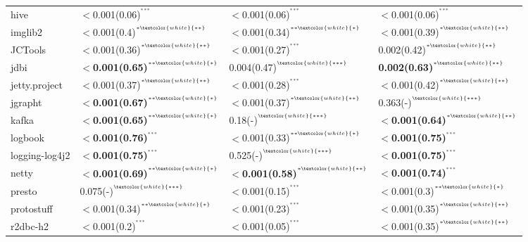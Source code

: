 \begin{tabular}{llll}
hive                &  $<$0.001(0.06)\tiny{$^{^{***}}$} &  $<$0.001(0.06)\tiny{$^{^{***}}$} &  $<$0.001(0.06)\tiny{$^{^{***}}$} \\
imglib2             &  $<$0.001(0.4)\tiny{$^{^{*\textcolor{white}{**}}}$} &  $<$0.001(0.34)\tiny{$^{^{**\textcolor{white}{*}}}$} &  $<$0.001(0.39)\tiny{$^{^{*\textcolor{white}{**}}}$} \\
JCTools             &  $<$0.001(0.36)\tiny{$^{^{*\textcolor{white}{**}}}$} &  $<$0.001(0.27)\tiny{$^{^{***}}$} &  0.002(0.42)\tiny{$^{^{*\textcolor{white}{**}}}$} \\
jdbi                &  \textbf{$<$0.001(0.65)}\tiny{$^{^{**\textcolor{white}{*}}}$} &  0.004(0.47)\tiny{$^{^{\textcolor{white}{***}}}$} &  \textbf{0.002(0.63)}\tiny{$^{^{*\textcolor{white}{**}}}$} \\
jetty.project       &  $<$0.001(0.37)\tiny{$^{^{*\textcolor{white}{**}}}$} &  $<$0.001(0.28)\tiny{$^{^{***}}$} &  $<$0.001(0.42)\tiny{$^{^{*\textcolor{white}{**}}}$} \\
jgrapht             &  \textbf{$<$0.001(0.67)}\tiny{$^{^{**\textcolor{white}{*}}}$} &  $<$0.001(0.37)\tiny{$^{^{*\textcolor{white}{**}}}$} &  0.363(-)\tiny{$^{^{\textcolor{white}{***}}}$} \\
kafka               &  \textbf{$<$0.001(0.65)}\tiny{$^{^{**\textcolor{white}{*}}}$} &  0.18(-)\tiny{$^{^{\textcolor{white}{***}}}$} &  \textbf{$<$0.001(0.64)}\tiny{$^{^{*\textcolor{white}{**}}}$} \\
logbook             &  \textbf{$<$0.001(0.76)}\tiny{$^{^{***}}$} &  $<$0.001(0.33)\tiny{$^{^{**\textcolor{white}{*}}}$} &  \textbf{$<$0.001(0.75)}\tiny{$^{^{***}}$} \\
logging-log4j2      &  \textbf{$<$0.001(0.75)}\tiny{$^{^{***}}$} &  0.525(-)\tiny{$^{^{\textcolor{white}{***}}}$} &  \textbf{$<$0.001(0.75)}\tiny{$^{^{***}}$} \\
netty               &  \textbf{$<$0.001(0.69)}\tiny{$^{^{**\textcolor{white}{*}}}$} &  \textbf{$<$0.001(0.58)}\tiny{$^{^{*\textcolor{white}{**}}}$} &  \textbf{$<$0.001(0.74)}\tiny{$^{^{***}}$} \\
presto              &  0.075(-)\tiny{$^{^{\textcolor{white}{***}}}$} &  $<$0.001(0.15)\tiny{$^{^{***}}$} &  $<$0.001(0.3)\tiny{$^{^{**\textcolor{white}{*}}}$} \\
protostuff          &  $<$0.001(0.34)\tiny{$^{^{**\textcolor{white}{*}}}$} &  $<$0.001(0.23)\tiny{$^{^{***}}$} &  $<$0.001(0.35)\tiny{$^{^{*\textcolor{white}{**}}}$} \\
r2dbc-h2            &  $<$0.001(0.2)\tiny{$^{^{***}}$} &  $<$0.001(0.05)\tiny{$^{^{***}}$} &  $<$0.001(0.35)\tiny{$^{^{*\textcolor{white}{**}}}$} \\

\end{tabular}
